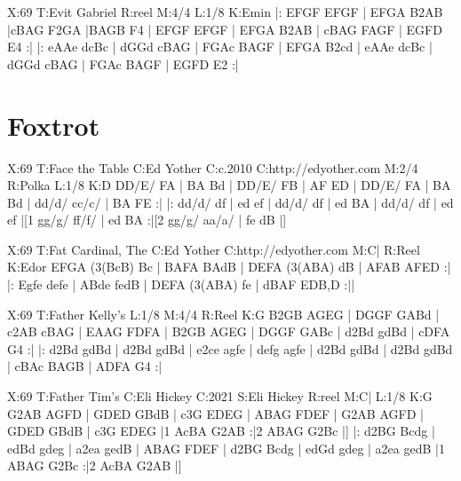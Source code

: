 \documentclass{article}
\begin{document}
\begin{abc}[name]
X:69
T:Evit Gabriel
R:reel
M:4/4
L:1/8
K:Emin
|: EFGF EFGF | EFGA B2AB |cBAG F2GA |BAGB F4 |
EFGF EFGF | EFGA B2AB | cBAG FAGF | EGFD E4 :|
|: eAAe dcBc | dGGd cBAG | FGAc BAGF | EFGA B2cd |
eAAe dcBc | dGGd cBAG | FGAc BAGF | EGFD E2 :|
\end{abc}

\section{Foxtrot}

\begin{abc}[name]
X:69
T:Face the Table
C:Ed Yother
C:c.2010
C:http://edyother.com
M:2/4
R:Polka
L:1/8
K:D
DD/E/ FA | BA Bd | DD/E/ FB | AF ED |
DD/E/ FA | BA Bd | dd/d/ cc/c/ | BA FE :|
|: dd/d/ df | ed ef | dd/d/ df | ed BA |
dd/d/ df | ed ef |[1 gg/g/ ff/f/ | ed BA :|[2 gg/g/ aa/a/ | fe dB |]
\end{abc}

\begin{abc}[name]
X:69
T:Fat Cardinal, The
C:Ed Yother
C:http://edyother.com
M:C|
R:Reel
K:Edor
EFGA (3(BcB) Bc | BAFA BAdB | DEFA (3(ABA) dB | AFAB AFED :|
|: Egfe defe | ABde fedB | DEFA (3(ABA) fe | dBAF EDB,D :||
\end{abc}

\begin{abc}[name]
X:69
T:Father Kelly's
L:1/8
M:4/4
R:Reel
K:G
B2GB AGEG | DGGF GABd | c2AB cBAG | EAAG FDFA |
B2GB AGEG | DGGF GABc | d2Bd gdBd | cDFA G4 :|
|: d2Bd gdBd | d2Bd gdBd | e2ce agfe | defg agfe |
d2Bd gdBd | d2Bd gdBd | cBAc BAGB | ADFA G4 :|
\end{abc}

\begin{abc}[name]
X:69
T:Father Tim's
C:Eli Hickey
C:2021
S:Eli Hickey
R:reel
M:C|
L:1/8
K:G
G2AB AGFD | GDED GBdB | c3G EDEG | ABAG FDEF |
G2AB AGFD | GDED GBdB | c3G EDEG |1 AcBA G2AB :|2 ABAG G2Bc |]
|: d2BG Bcdg | edBd gdeg | a2ea gedB | ABAG FDEF |
d2BG Bcdg | edGd gdeg | a2ea gedB |1 ABAG G2Bc :|2 AcBA G2AB |]
\end{abc}
\end{document}

